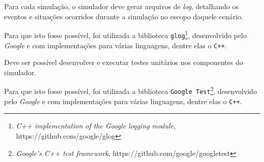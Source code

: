 \begin{description}[leftmargin=!,labelwidth=\widthof{\bfseries Determinístico}]
  \item[Rastreável]

  Para cada simulação, o simulador deve gerar arquivos de \textit{log},
  detalhando os eventos e situações ocorridos durante a simulação no escopo
  daquele cenário.

  Para que isto fosse possível, foi utilizada a biblioteca
  \texttt{glog}\footnote{\textit{C++ implementation of the Google logging
  module}, https://github.com/google/glog}, desenvolvido pelo \textit{Google} e
  com implementações para várias linguagens, dentre elas o \texttt{C++}.

  \item[Testável]

  Deve ser possível desenvolver e executar testes unitários nos componentes do
  simulador.

  Para que isto fosse possível, foi utilizada a biblioteca \texttt{Google
  Test}\footnote{\textit{Google's C++ test framework},
  https://github.com/google/googletest}, desenvolvido pelo \textit{Google} e
  com implementações para várias linguagens, dentre elas o \texttt{C++}.

\end{description}
